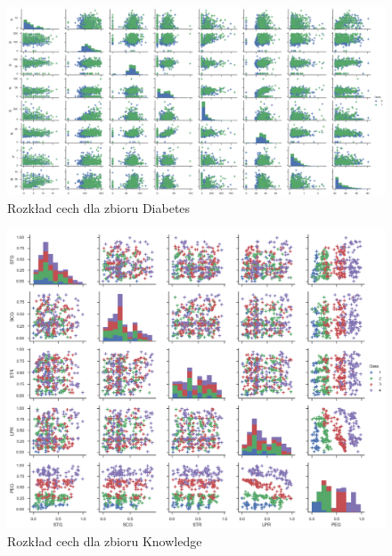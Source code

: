 \documentclass[12pt,a4paper]{article}
\begin{document}
\begin{figure}[H]
\centering
\includegraphics[width=1\textwidth]{dsDiabetesCombined.png}
\caption{Rozkład cech dla zbioru Diabetes}
\end{figure}

\begin{figure}[H]
\centering
\includegraphics[width=1\textwidth]{dsKnowledgeCombined.png}
\caption{Rozkład cech dla zbioru Knowledge}
\end{figure}
\end{document}

